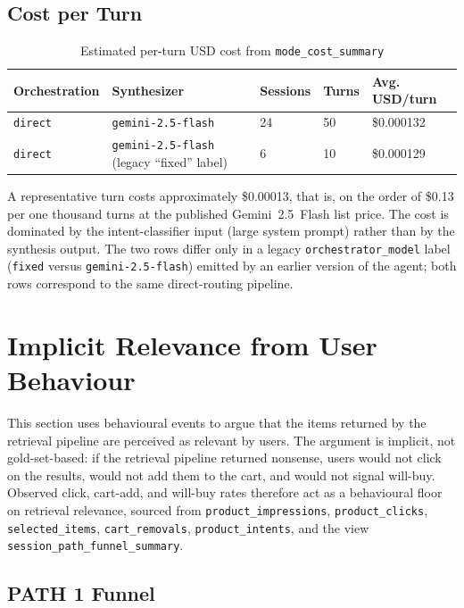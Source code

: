 \subsection{Cost per Turn}
\label{subsec:cost_per_turn}

\begin{table}[H]
\centering
\begin{tabular}{p{3cm}p{3cm}p{2cm}p{2cm}p{3cm}}
\toprule
\textbf{Orchestration} & \textbf{Synthesizer} & \textbf{Sessions} & \textbf{Turns} & \textbf{Avg. USD/turn}\\
\midrule
\texttt{direct} & \texttt{gemini-2.5-flash} & 24 & 50 & \$0.000132\\
\texttt{direct} & \texttt{gemini-2.5-flash} (legacy ``fixed'' label) & 6 & 10 & \$0.000129\\
\bottomrule
\end{tabular}
\caption{Estimated per-turn USD cost from \texttt{mode\_cost\_summary}}
\label{tab:cost_per_turn}
\end{table}

A representative turn costs approximately \$0.00013, that is, on the order of \$0.13 per one thousand turns at the published Gemini~2.5~Flash list price. The cost is dominated by the intent-classifier input (large system prompt) rather than by the synthesis output. The two rows differ only in a legacy \texttt{orchestrator\_model} label (\texttt{fixed} versus \texttt{gemini-2.5-flash}) emitted by an earlier version of the agent; both rows correspond to the same direct-routing pipeline.


\section{Implicit Relevance from User Behaviour}
\label{sec:implicit_relevance}

This section uses behavioural events to argue that the items returned by the retrieval pipeline are perceived as relevant by users. The argument is implicit, not gold-set-based: if the retrieval pipeline returned nonsense, users would not click on the results, would not add them to the cart, and would not signal will-buy. Observed click, cart-add, and will-buy rates therefore act as a behavioural floor on retrieval relevance, sourced from \texttt{product\_impressions}, \texttt{product\_clicks}, \texttt{selected\_items}, \texttt{cart\_removals}, \texttt{product\_intents}, and the view \texttt{session\_path\_funnel\_summary}.

\subsection{PATH 1 Funnel}
\label{subsec:path1_funnel}


